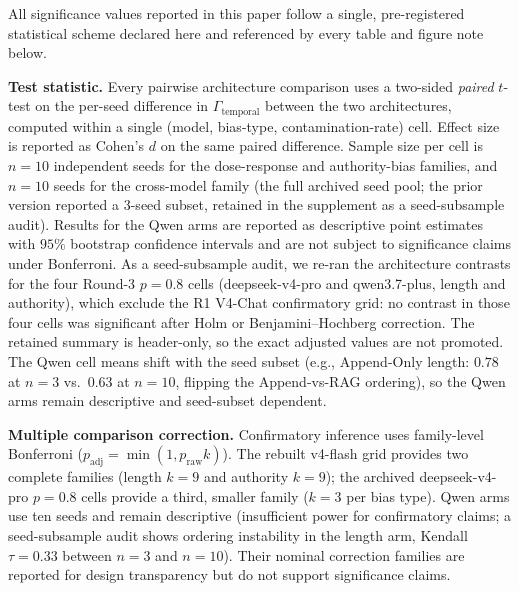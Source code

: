 \documentclass[11pt]{article}
\begin{document}
All significance values reported in this paper follow a single, pre-registered statistical scheme declared here and referenced by every table and figure note below.

\textbf{Test statistic.} Every pairwise architecture comparison uses a two-sided \emph{paired} $t$-test on the per-seed difference in $\Gamma_{\text{temporal}}$ between the two architectures, computed within a single (model, bias-type, contamination-rate) cell. Effect size is reported as Cohen's $d$ on the same paired difference. Sample size per cell is $n=10$ independent seeds for the dose-response and authority-bias families, and $n=10$ seeds for the cross-model family (the full archived seed pool; the prior version reported a $3$-seed subset, retained in the supplement as a seed-subsample audit). Results for the Qwen arms are reported as descriptive point estimates with $95\%$ bootstrap confidence intervals and are not subject to significance claims under Bonferroni. As a seed-subsample audit, we re-ran the architecture contrasts for the four Round-3 $p{=}0.8$ cells (deepseek-v4-pro and qwen3.7-plus, length and authority), which exclude the R1 V4-Chat confirmatory grid: no contrast in those four cells was significant after Holm or Benjamini--Hochberg correction. The retained summary is header-only, so the exact adjusted values are not promoted. The Qwen cell means shift with the seed subset (e.g., Append-Only length: $0.78$ at $n{=}3$ vs.\ $0.63$ at $n{=}10$, flipping the Append-vs-RAG ordering), so the Qwen arms remain descriptive and seed-subset dependent.

\textbf{Multiple comparison correction.} Confirmatory inference uses family-level Bonferroni ($p_{\text{adj}} = \min(1,p_{\text{raw}}k)$). The rebuilt v4-flash grid provides two complete families (length $k{=}9$ and authority $k{=}9$); the archived deepseek-v4-pro $p{=}0.8$ cells provide a third, smaller family ($k{=}3$ per bias type). Qwen arms use ten seeds and remain descriptive (insufficient power for confirmatory claims; a seed-subsample audit shows ordering instability in the length arm, Kendall $\tau=0.33$ between $n{=}3$ and $n{=}10$). Their nominal correction families are reported for design transparency but do not support significance claims.
\end{document}
